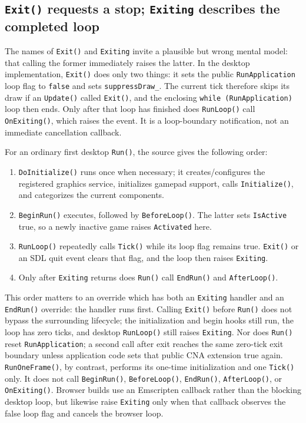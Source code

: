 \subsection{\texttt{Exit()} requests a stop; \texttt{Exiting} describes the completed loop}

The names of \texttt{Exit()} and \texttt{Exiting} invite a plausible but wrong mental model: that
calling the former immediately raises the latter. In the desktop implementation, \texttt{Exit()}
does only two things: it sets the public \texttt{RunApplication} loop flag to \texttt{false} and
sets \texttt{suppressDraw\_}. The current tick therefore skips its draw if an \texttt{Update()}
called \texttt{Exit()}, and the enclosing \texttt{while (RunApplication)} loop then ends. Only
after that loop has finished does \texttt{RunLoop()} call \texttt{OnExiting()}, which raises the
event. It is a loop-boundary notification, not an immediate cancellation callback.

For an ordinary first desktop \texttt{Run()}, the source gives the following order:

\begin{enumerate}
  \item \texttt{DoInitialize()} runs once when necessary; it creates/configures the registered
    graphics service, initializes gamepad support, calls \texttt{Initialize()}, and categorizes
    the current components.
  \item \texttt{BeginRun()} executes, followed by \texttt{BeforeLoop()}. The latter sets
    \texttt{IsActive} true, so a newly inactive game raises \texttt{Activated} here.
  \item \texttt{RunLoop()} repeatedly calls \texttt{Tick()} while its loop flag remains true.
    \texttt{Exit()} or an SDL quit event clears that flag, and the loop then raises
    \texttt{Exiting}.
  \item Only after \texttt{Exiting} returns does \texttt{Run()} call \texttt{EndRun()} and
    \texttt{AfterLoop()}.
\end{enumerate}

This order matters to an override which has both an \texttt{Exiting} handler and an
\texttt{EndRun()} override: the handler runs first. Calling \texttt{Exit()} before \texttt{Run()}
does not bypass the surrounding lifecycle; the initialization and begin hooks still run, the
loop has zero ticks, and desktop \texttt{RunLoop()} still raises \texttt{Exiting}. Nor does
\texttt{Run()} reset \texttt{RunApplication}; a second call after exit reaches the same
zero-tick exit boundary unless application code sets that public CNA extension true again.
\texttt{RunOneFrame()}, by contrast, performs its one-time initialization and one \texttt{Tick()}
only. It does not call \texttt{BeginRun()}, \texttt{BeforeLoop()}, \texttt{EndRun()},
\texttt{AfterLoop()}, or \texttt{OnExiting()}. Browser builds use an Emscripten callback rather
than the blocking desktop loop, but likewise raise \texttt{Exiting} only when that callback
observes the false loop flag and cancels the browser loop.


